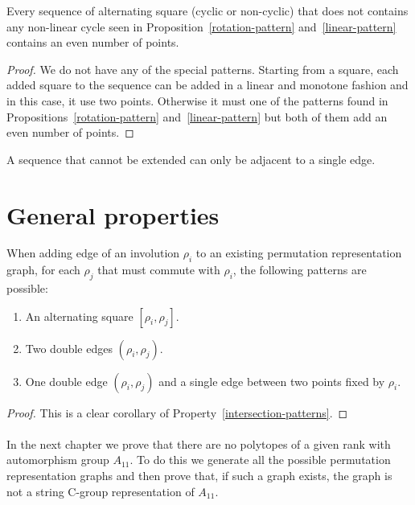 \begin{corollary}
  \label{even-sequence}
  Every sequence of alternating square (cyclic or non-cyclic) that does not contains any non-linear cycle seen in Proposition~\ref{rotation-pattern} and~\ref{linear-pattern} contains an even number of points.
\end{corollary}

\begin{proof}
  We do not have any of the special patterns. Starting from a square, each added square to the sequence can be added in a linear and monotone fashion and in this case, it use two points. Otherwise it must one of the patterns found in Propositions~\ref{rotation-pattern} and~\ref{linear-pattern} but both of them add an even number of points.
\end{proof}

\begin{proposition}
  \label{sequence-connection}
  A sequence that cannot be extended can only be adjacent to a single edge.
\end{proposition}

\section{General properties}

\begin{proposition}
  \label{patterns-adding}
  When adding edge of an involution $\rho_i$ to an existing permutation representation graph, for each $\rho_j$ that must commute with $\rho_i$, the following patterns are possible:
  \begin{enumerate}
    \item An alternating square $[\rho_i, \rho_j]$.
    \item Two double edges $(\rho_i, \rho_j)$.
    \item One double edge $(\rho_i, \rho_j)$ and a single edge between two points fixed by $\rho_i$.
  \end{enumerate}
\end{proposition}

\begin{proof}
  This is a clear corollary of Property~\ref{intersection-patterns}.
\end{proof}

\paragraph{}
In the next chapter we prove that there are no polytopes of a given rank with automorphism group $A_{11}$. To do this we generate all the possible permutation representation graphs and then prove that, if such a graph exists, the graph is not a string C-group representation of $A_{11}$.


